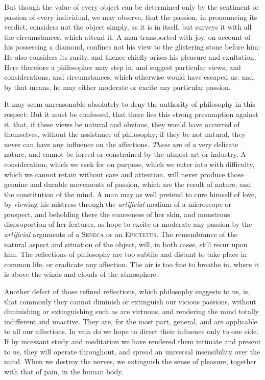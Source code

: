 But though the value of every object can be determined only by the
sentiment or passion of every individual, we may observe, that the
passion, in pronouncing its verdict, considers not the object simply,
as it is in itself, but surveys it with all the circumstances, which
attend it. A man transported with joy, on account of his possessing a
diamond, confines not his view to the glistering stone before him: He
also considers its rarity, and thence chiefly arises his pleasure and
exultation. Here therefore a philosopher may step in, and suggest
particular views, and considerations, and circumstances, which
otherwise would have escaped us; and, by that means, he may either
moderate or excite any particular passion.

It may seem unreasonable absolutely to deny the authority of
philosophy in this respect: But it must be confessed, that there lies
this strong presumption against it, that, if these views be natural
and obvious, they would have occurred of themselves, without the
assistance of philosophy; if they be not natural, they never can have
any influence on the affections. \textit{These} are of a very delicate
nature, and cannot be forced or constrained by the utmost art or
industry. A consideration, which we seek for on purpose, which we
enter into with difficulty, which we cannot retain without 
care and attention, will never produce those genuine and durable
movements of passion, which are the result of nature, and the
constitution of the mind. A man may as well pretend to cure himself of
love, by viewing his mistress through the \textit{artificial} medium
of a microscope or prospect, and beholding there the coarseness of her
skin, and monstrous disproportion of her features, as hope to excite
or moderate any passion by the \textit{artificial} arguments of a
\textsc{Seneca} or an \textsc{Epictetus}. The remembrance of the
natural aspect and situation of the object, will, in both cases, still
recur upon him. The reflections of philosophy are too subtile and
distant to take place in common life, or eradicate any affection. The
air is too fine to breathe in, where it is above the winds and clouds
of the atmosphere.

Another defect of those refined reflections, which philosophy suggests
to us, is, that commonly they cannot diminish or extinguish our
vicious passions, without diminishing or extinguishing such as are
virtuous, and rendering the mind totally indifferent and unactive.
They are, for the most part, general, and are applicable to all our
affections. In vain do we hope to direct their influence only to one
side. If by incessant study and meditation we have rendered them
intimate and present to us, they will operate throughout, and spread
an universal insensibility over the mind. When we destroy the nerves,
we extinguish the sense of pleasure, together with that of pain, in
the human body.

